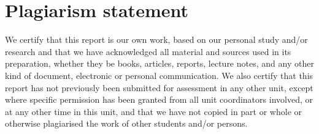 \section*{Plagiarism statement}

We certify that this report is our own work, based on our personal study and/or research and that we have acknowledged all material and sources used in its preparation, whether they be books, articles, reports, lecture notes, and any other kind of document, electronic or personal communication.
We also certify that this report has not previously been submitted for assessment in any other unit, except where specific permission has been granted from all unit coordinators involved, or at any other time in this unit, and that we have not copied in part or whole or otherwise plagiarised the work of other students and/or persons.

